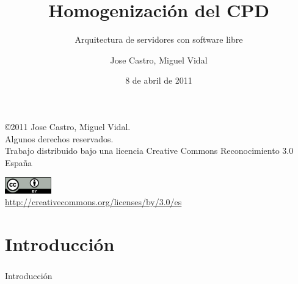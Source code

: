 \documentclass{beamer}
\begin{document}
\title{Homogenización del CPD}
\subtitle{Arquitectura de servidores con software libre}
\author{Jose Castro, Miguel Vidal}
\date{8 de abril de 2011}


\begin{frame}
  \vspace{2cm}
  \begin{flushright}
    {\footnotesize \copyright{2011} Jose Castro, Miguel Vidal.} \\
    \vspace{0.25cm}
    {\scriptsize Algunos derechos reservados. \\
    Trabajo distribuido bajo una licencia Creative Commons Reconocimiento 3.0 España}\\
    \vspace{0.10cm}
  \end{flushright}
  \begin{center}
    \href{http://creativecommons.org/licenses/by/3.0/es}{\includegraphics[width=2cm]{figs/cc-by.png}} \\
    {\tiny \url{http://creativecommons.org/licenses/by/3.0/es}}
  \end{center}
\end{frame}


\section{Introducción}
\begin{frame}
  \frametitle{}
  \begin{center}
    \Huge Introducción
  \end{center}
\end{frame}
\end{document}
